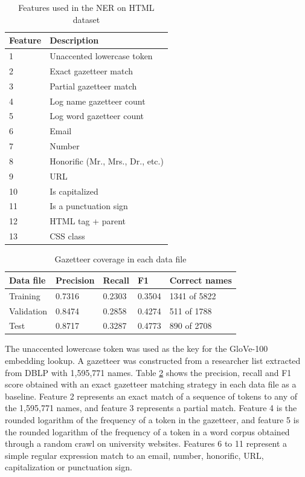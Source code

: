 \documentclass{nle}
\begin{document}
\begin{table}[h]
  \small
  \begin{center}
    \begin{tabular}{ ll }
      \toprule
      Feature & Description \\
      \midrule
      1  & Unaccented lowercase token \\
      2  & Exact gazetteer match \\
      3  & Partial gazetteer match \\
      4  & Log name gazetteer count\\
      5  & Log word gazetteer count\\
      6  & Email \\
      7  & Number \\
      8  & Honorific (Mr., Mrs., Dr., etc.)\\
      9  & URL \\
      10 & Is capitalized \\
      11 & Is a punctuation sign \\
      12 & HTML tag + parent \\
      13 & CSS class \\
      \bottomrule
    \end{tabular}
  \end{center}
  \caption{Features used in the NER on HTML dataset}
  \label{tab:features}
\end{table}

\begin{table}[h]
  \small
  \begin{center}
    \begin{tabular}{ lllll }
      \toprule
      Data file & Precision & Recall & F1 & Correct names \\
      \midrule
      Training   & 0.7316 & 0.2303 & 0.3504 & 1341 of 5822 \\ 
      Validation & 0.8474 & 0.2858 & 0.4274 & 511 of 1788 \\ 
      Test       & 0.8717 & 0.3287 & 0.4773 & 890 of 2708 \\ 
      \bottomrule
    \end{tabular}
  \end{center}
  \caption{Gazetteer coverage in each data file}
  \label{tab:gazetteer}
\end{table}

The unaccented lowercase token was used as the key for the GloVe-100 embedding lookup.
A gazetteer was constructed from a researcher list extracted from DBLP with 1,595,771
names. Table \ref{tab:gazetteer} shows the precision, recall and F1 score obtained with an
exact gazetteer matching strategy in each data file as a baseline.
Feature 2 represents an exact match of a sequence of tokens to any of the 1,595,771 
names, and feature 3 represents a partial match. Feature 4 is the rounded logarithm of 
the frequency of a token in the gazetteer, and feature 5 is the rounded logarithm of the frequency
of a token in a word corpus obtained through a random crawl on university websites.
Features 6 to 11 represent a simple regular expression match to an email, number, 
honorific, URL, capitalization or punctuation sign.
\end{document}
